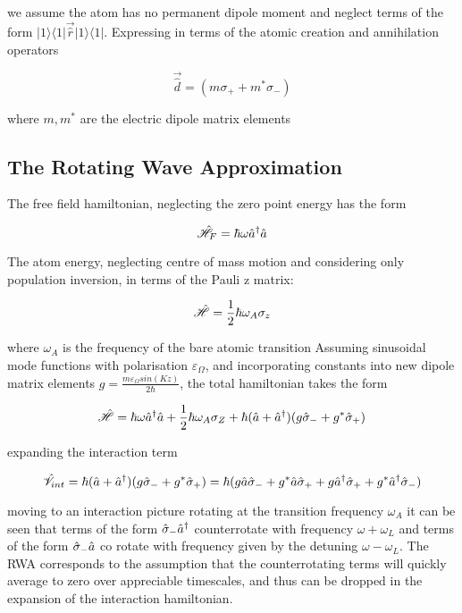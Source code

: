 we assume the atom has no permanent dipole moment and neglect terms of the form $| 1 \rangle \langle 1|\vec{\hat{r}} | 1 \rangle \langle 1 |$.
Expressing in terms of the atomic creation and annihilation operators

\begin{equation}
	\vec{\hat{d}} = (m\sigma_+ + m^* \sigma_-)
\end{equation}

where $m, m^*$ are the electric dipole matrix elements

\subsection{The Rotating Wave Approximation}
The free field hamiltonian, neglecting the zero point energy has the form

\begin{equation}
	\hat{\mathscr{H}}_F =  \hbar \omega \hat{a}^\dagger \hat{a}
\end{equation}

The atom energy, neglecting centre of mass motion and considering only population inversion, in terms of the Pauli z matrix:

\begin{equation}
	\hat{\mathscr{H}} = \frac {1} {2} \hbar \omega_A \sigma_z
\end{equation}

where $\omega_A$ is the frequency of the bare atomic transition
Assuming sinusoidal mode functions with polarisation $\varepsilon_\Omega$, and incorporating constants into new dipole matrix elements $g = \frac{m \varepsilon_\Omega sin(Kz)} {2 \hbar}$, the total hamiltonian takes the form

\begin{equation}
	\hat{\mathscr{H}} = \hbar \omega \hat{a}^\dagger \hat{a} +\frac{1}{2} \hbar \omega_A \sigma_Z + \hbar (\hat{a} +\hat{a}^\dagger)(g\hat{\sigma}_-+g^*\hat{\sigma}_+)
\end{equation}

expanding the interaction term

\begin{equation}
	\hat{\mathscr{V}}_{int} = \hbar (\hat{a} +\hat{a}^\dagger)(g\hat{\sigma}_-+g^*\hat{\sigma}_+) =  \hbar (g \hat{a} \hat{\sigma}_- + g^* \hat{a} \hat{\sigma}_+ + g \hat{a}^\dagger \hat{\sigma}_+ +g^* \hat{a}^\dagger\hat{\sigma}_-)
\end{equation}

moving to an interaction picture rotating at the transition frequency $\omega_A$ it can be seen that terms of the form $\hat{\sigma}_- \hat{a}^\dagger $ counterrotate with frequency $\omega + \omega_L$ and terms of the form $ \hat{\sigma}_- \hat{a}$ co rotate with frequency given by the detuning $\omega-\omega_L$.
The RWA corresponds to the assumption that the counterrotating terms will quickly average to zero over appreciable timescales, and thus can be dropped in the expansion of the interaction hamiltonian.

